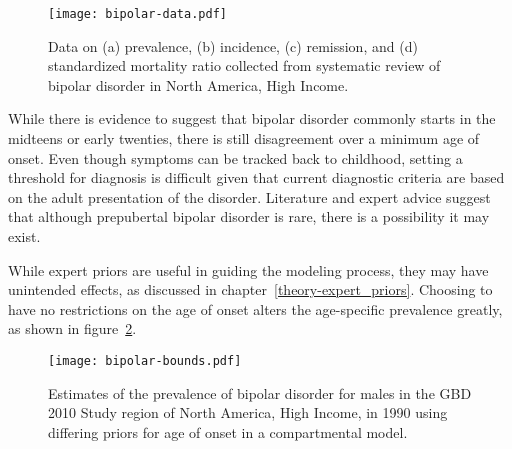     \begin{figure}[h]
        \begin{center}
            \texttt{[image: bipolar-data.pdf]}
            \caption[Systematic review data for bipolar disorder.]{Data on 
            (a) prevalence, (b) incidence, (c) remission, and
              (d) standardized mortality ratio collected from systematic review
              of bipolar disorder in 
              North America, High Income.}
            \label{fig:app-bipolar data}
        \end{center}
    \end{figure}

While there is evidence to suggest that bipolar disorder commonly
starts in the midteens or early twenties, there is still disagreement
over a minimum age of onset.  Even though symptoms can be tracked back
to childhood, setting a threshold for diagnosis is difficult given
that current diagnostic criteria are based on the adult presentation of
the disorder.  Literature and expert advice suggest that although
prepubertal bipolar disorder is rare, there is a possibility it may
exist. \cite{kloos_bipolar_2011, angst_historical_2000}

While expert priors are useful in guiding the modeling process, they
may have unintended effects, as discussed in chapter~\ref{theory-expert_priors}.
Choosing to have no restrictions on the
age of onset alters the age-specific prevalence greatly, as shown in
figure~\ref{fig:app-bipolar bounds}.

    \begin{figure}[h]
        \begin{center}
            \texttt{[image: bipolar-bounds.pdf]}
            \caption[Comparison of prevalence estimates for bipolar disorder
              using differing priors for the age of onset in a compartmental
              modle.]{Estimates of the prevalence of bipolar disorder
              for males in the GBD 2010 Study region of North America, High Income,
              in 1990 using differing priors for age of onset
              in a compartmental model.}
            \label{fig:app-bipolar bounds}
        \end{center}
    \end{figure}

